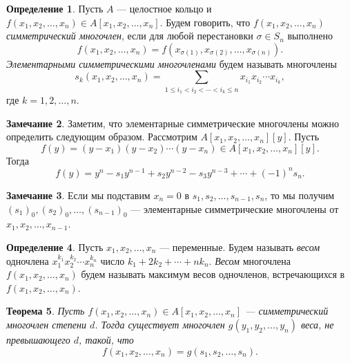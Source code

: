 \documentclass[12pt, titlepage, oneside]{amsbook}
\newtheorem{theorem}{Теорема}[chapter]
\theoremstyle{definition}
\newtheorem{definition}[theorem]{Определение}
\newtheorem{remark}[theorem]{Замечание}
\theoremstyle{remark}
\begin{document}
\begin{definition}
	Пусть $A$ --- целостное кольцо и $f(x_1,x_2,\ldots,x_n)\in A[x_1,x_2,\ldots, x_n]$. Будем говорить, что $f(x_1,x_2,\ldots,x_n)$ \emph{симметрический многочлен}, если для любой перестановки $\sigma\in S_n$ выполнено $$f(x_1,x_2,\ldots,x_n)=f(x_{\sigma(1)},x_{\sigma(2)},\ldots,x_{\sigma(n)}).$$ \emph{Элементарными симметрическими многочленами} будем называть многочлены $$s_k(x_1,x_2,\ldots,x_n)=\sum\limits_{1\leq i_1<i_2<\cdots< i_k\leq n} x_{i_1}x_{i_2}\cdots x_{i_k},$$ где $k=1,2,\ldots,n$.
\end{definition}

\begin{remark}
	Заметим, что элементарные симметрические многочлены можно определить следующим образом. Рассмотрим $A[x_1,x_2,\ldots, x_n][y]$. Пусть $$f(y)=(y-x_1)(y-x_2)\cdots(y-x_n)\in A[x_1,x_2,\ldots, x_n][y].$$ Тогда $$f(y)=y^n-s_1y^{n-1}+s_2y^{n-2}-s_3y^{n-3}+\cdots+(-1)^ns_n.$$
\end{remark}

\begin{remark}
	Если мы подставим $x_n=0$ в $s_1,s_2,\ldots,s_{n-1},s_n$, то мы получим $(s_1)_0,(s_2)_0,\ldots,(s_{n-1})_0$ --- элементарные симметрические многочлены от $x_1,x_2,\ldots,x_{n-1}$.
\end{remark}

\begin{definition}
	Пусть $x_1,x_2,\ldots, x_n$ --- переменные. Будем называть \emph{весом} одночлена $x_1^{k_1}x_2^{k_2}\cdots x_n^{k_n}$ число $k_1+2k_2+\cdots+nk_n$. \emph{Весом} многочлена $f(x_1,x_2,\ldots,x_n)$ будем называть максимум весов одночленов, встречающихся в $f(x_1,x_2,\ldots,x_n)$.
\end{definition}

\begin{theorem}
	\label{SimMn1}
	Пусть $f(x_1,x_2,\ldots,x_n)\in A[x_1,x_2,\ldots, x_n]$ --- симметрический многочлен степени $d$. Тогда существует многочлен $g(y_1,y_2,\ldots,y_n)$ веса, не превышающего $d$, такой, что $$f(x_1,x_2,\ldots,x_n)=g(s_1,s_2,\ldots,s_n).$$
\end{theorem}
\end{document}
